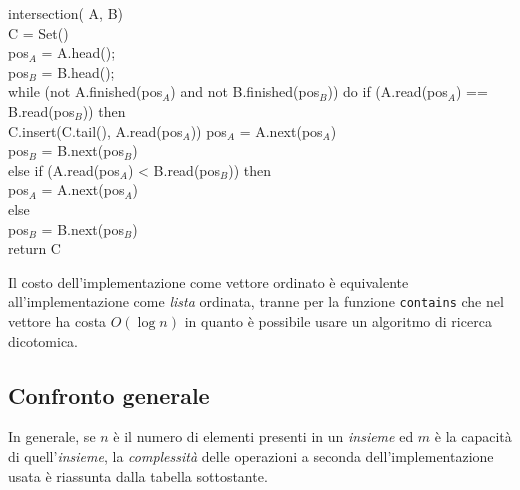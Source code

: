 \begin{codecont}
\ind{} intersection( A,  B)\\
     C = Set()\\
     pos$_A$ = A.head();\\
     pos$_B$ = B.head();\\
    \ind while (not A.finished(pos$_A$) and not B.finished(pos$_B$)) do\hfill{}
        \indf if  (A.read(pos$_A$) == B.read(pos$_B$)) then\\
            \indff C.insert(C.tail(), A.read(pos$_A$))\hfill{}
            \indff pos$_A$ = A.next(pos$_A$)\\
            \indff pos$_B$ = B.next(pos$_B$)\\
        \indf else if (A.read(pos$_A$) < B.read(pos$_B$)) then\\
            \indff pos$_A$ = A.next(pos$_A$)\\
        \indf else\\
            \indff pos$_B$ = B.next(pos$_B$)\\
    \indent return C\\
\end{codecont}
\begin{note}
    Il costo dell'implementazione come vettore ordinato è equivalente
    all'implementazione come \emph{lista} ordinata, tranne per la funzione
    \texttt{contains} che nel vettore ha costa $O(\log n)$ in quanto è
    possibile usare un algoritmo di ricerca dicotomica.
\end{note}

\subsection{Confronto generale}
In generale, se $n$ è il numero di elementi presenti in un \emph{insieme} ed \hspace{-3pt}
$m$ è la capacità di quell'\emph{insieme}, la \emph{complessità} delle operazioni
a seconda dell'implementazione usata è riassunta dalla tabella sottostante.

